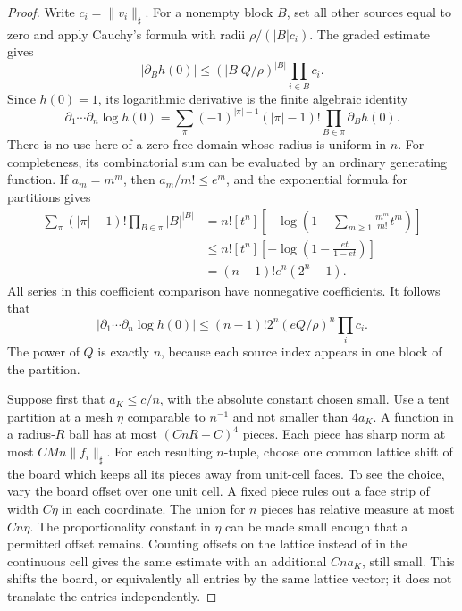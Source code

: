 \documentclass[11pt,letterpaper,reqno]{amsart}
\theoremstyle{definition}
\theoremstyle{remark}
\begin{document}
\begin{proof}
Write $c_i=\|v_i\|_\sharp$. For a nonempty block $B$, set all other
sources equal to zero and apply Cauchy's formula with radii
$\rho/(|B|c_i)$. The graded estimate gives
\[
 |\partial_Bh(0)|\le(|B|Q/\rho)^{|B|}\prod_{i\in B}c_i.
\]
Since $h(0)=1$, its logarithmic derivative is the finite algebraic
identity
\[
 \partial_1\cdots\partial_n\log h(0)
  =\sum_\pi(-1)^{|\pi|-1}(|\pi|-1)!
                        \prod_{B\in\pi}\partial_Bh(0).
\]
There is no use here of a zero-free domain whose radius is uniform in
$n$. For completeness, its combinatorial sum can be evaluated by an
ordinary generating function. If $a_m=m^m$, then $a_m/m!\le e^m$,
and the exponential formula for partitions gives
\begin{align*}
 \sum_{\pi}(|\pi|-1)!\prod_{B\in\pi}|B|^{|B|}
 &=n![t^n]\left[-\log\left(1-\sum_{m\ge1}
                                      \frac{m^m}{m!}t^m\right)\right]\\
 &\le n![t^n]\left[-\log\left(1-\frac{et}{1-et}\right)\right]\\
 &=(n-1)!e^n(2^n-1).
\end{align*}
All series in this coefficient comparison have nonnegative
coefficients. It follows that
\begin{equation}\label{eq:cumulant-combinatorics}
 |\partial_1\cdots\partial_n\log h(0)|
       \le(n-1)!2^n(eQ/\rho)^n\prod_ic_i.
\end{equation}
The power of $Q$ is exactly $n$, because each source index appears in
one block of the partition.

Suppose first that $a_K\le c/n$, with the absolute constant chosen
small. Use a tent partition at a mesh $\eta$ comparable to $n^{-1}$
and not smaller than $4a_K$. A function in a radius-$R$ ball has at
most $(CnR+C)^4$ pieces. Each piece has sharp norm at most
$CMn\|f_i\|_\sharp$. For each resulting $n$-tuple, choose one
common lattice shift of the board which keeps all its pieces away from
unit-cell faces. To see the choice, vary the board offset over one
unit cell. A fixed piece rules out a face strip of width $C\eta$ in
each coordinate. The union for $n$ pieces has relative measure at
most $Cn\eta$. The proportionality constant in $\eta$ can be made
small enough that a permitted offset remains. Counting offsets on
the lattice instead of in the continuous cell gives the same estimate
with an additional $Cna_K$, still small. This shifts the board, or
equivalently all entries by the same lattice vector; it does not
translate the entries independently.


\end{proof}
\end{document}
